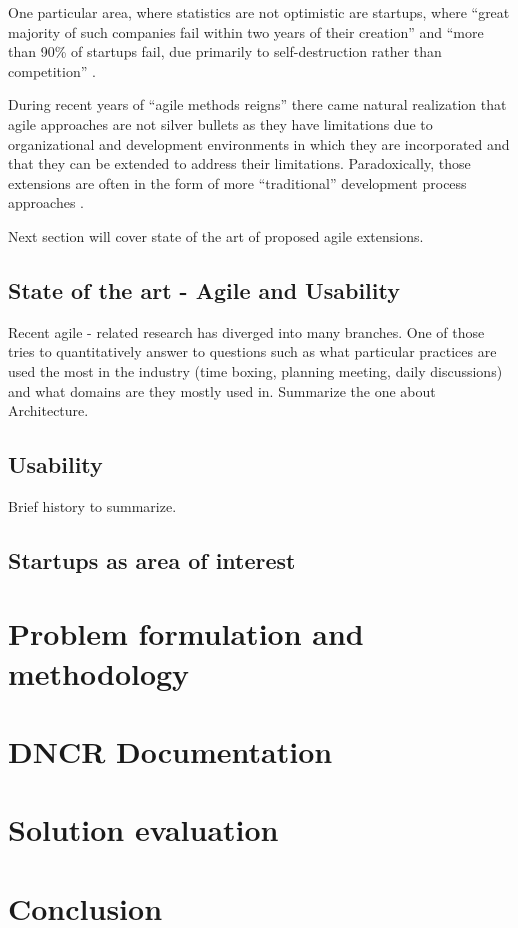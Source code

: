 \documentclass{article}
\begin{document}
One particular area, where statistics are not optimistic are startups, where ``great majority of such companies fail within two years of their creation'' \cite{paternoster2014software} and ``more than 90\% of startups fail, due primarily to self-destruction rather than competition'' \cite{giardino2014early}.

During recent years of ``agile methods reigns'' there came natural realization that agile approaches are not silver bullets as they have limitations due to organizational and development environments in which they are incorporated and that they can be extended to address their limitations. Paradoxically, those extensions are often in the form of more ``traditional'' development process approaches \cite{turk2014assumptions}.

Next section will cover state of the art of proposed agile extensions.
 


\subsection{State of the art - Agile and Usability}
Recent agile - related research has diverged into many branches. One of those tries to quantitatively answer to questions such as what particular practices are used the most in the industry (time boxing, planning meeting, daily discussions) and what domains are they mostly used in.\cite{diebold2014agile}
Summarize the one about Architecture.

\subsection{Usability}
Brief history to summarize. \cite{ritter2014user}
\subsection{Startups as area of interest}
\section{Problem formulation and methodology}
\section{DNCR Documentation}
\section{Solution evaluation}
\section{Conclusion}

 
\end{document}
